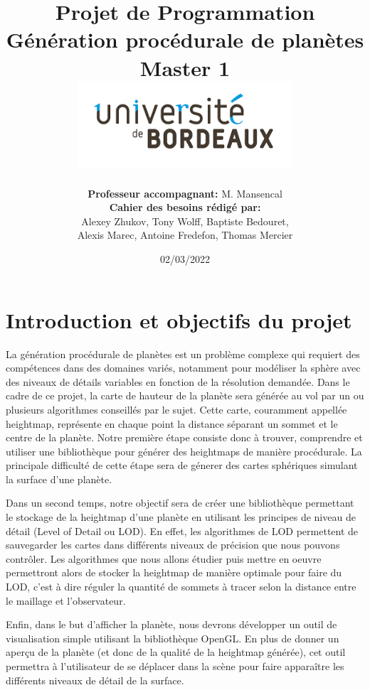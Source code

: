 \documentclass[12pt]{report}
\title{
{\LARGE \textbf{ Projet de Programmation \\ Génération procédurale de planètes }}\\
 {\large Master 1 }\\
 {\vspace{10mm}}
 {\includegraphics[width=0.6\textwidth]{images/télécharger.png}}
 }
\author{\textbf{Professeur accompagnant:} M. Mansencal\\\textbf{Cahier des besoins rédigé par:} \\Alexey Zhukov, Tony Wolff, Baptiste Bedouret, \\Alexis Marec, Antoine Fredefon, Thomas Mercier}
\date{02/03/2022}
\begin{document}
\maketitle
\clearpage

\tableofcontents
{}
\newpage

\chapter{Introduction et objectifs du projet}


La génération procédurale de planètes est un problème complexe qui requiert des compétences dans des domaines variés, notamment pour modéliser la sphère avec des niveaux de détails variables en fonction de la résolution demandée. Dans le cadre de ce projet, la carte de hauteur de la planète sera générée au vol par un ou plusieurs algorithmes conseillés par le sujet. Cette carte, couramment appellée heightmap, représente en chaque point la distance séparant un sommet et le centre de la planète. Notre première étape consiste donc à trouver, comprendre et utiliser une bibliothèque pour générer des heightmaps de manière procédurale. La principale difficulté de cette étape sera de génerer des cartes sphériques simulant la surface d'une planète.

Dans un second temps, notre objectif sera de créer une bibliothèque permettant le stockage de la heightmap d'une planète en utilisant les principes de niveau de détail (Level of Detail ou LOD). En effet, les algorithmes de LOD permettent de sauvegarder les cartes dans différents niveaux de précision que nous pouvons contrôler. Les algorithmes que nous allons étudier puis mettre en oeuvre permettront alors de stocker la heightmap de manière optimale pour faire du LOD, c'est à dire réguler la quantité de sommets à tracer selon la distance entre le maillage et l'observateur.

Enfin, dans le but d'afficher la planète, nous devrons développer un outil de visualisation simple utilisant la bibliothèque OpenGL. En plus de donner un aperçu de la planète (et donc de la qualité de la heightmap générée), cet outil permettra à l'utilisateur de se déplacer dans la scène pour faire apparaître les différents niveaux de détail de la surface.
\end{document}
